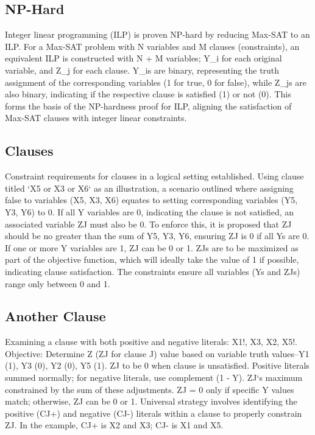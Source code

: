 \subsection*{NP-Hard}
Integer linear programming (ILP) is proven NP-hard by reducing Max-SAT to an ILP\@.
For a Max-SAT problem with N variables and M clauses (constraints), an equivalent ILP is constructed with N + M variables; Y\_i for each original variable, and Z\_j for each clause.
Y\_is are binary, representing the truth assignment of the corresponding variables (1 for true, 0 for false), while Z\_js are also binary, indicating if the respective clause is satisfied (1) or not (0).
This forms the basis of the NP-hardness proof for ILP, aligning the satisfaction of Max-SAT clauses with integer linear constraints.

\subsection*{Clauses}
Constraint requirements for clauses in a logical setting established.
Using clause titled `X5 or X3 or X6` as an illustration, a scenario outlined where assigning false to variables (X5, X3, X6) equates to setting corresponding variables (Y5, Y3, Y6) to 0.
If all Y variables are 0, indicating the clause is not satisfied, an associated variable ZJ must also be 0.
To enforce this, it is proposed that ZJ should be no greater than the sum of Y5, Y3, Y6, ensuring ZJ is 0 if all Ys are 0.
If one or more Y variables are 1, ZJ can be 0 or 1.
ZJs are to be maximized as part of the objective function, which will ideally take the value of 1 if possible, indicating clause satisfaction.
The constraints ensure all variables (Ys and ZJs) range only between 0 and 1.

\subsection*{Another Clause}
Examining a clause with both positive and negative literals: X1!, X3, X2, X5!.
Objective: Determine Z (ZJ for clause J) value based on variable truth values--Y1 (1), Y3 (0), Y2 (0), Y5 (1).
ZJ to be 0 when clause is unsatisfied.
Positive literals summed normally; for negative literals, use complement (1 - Y).
ZJ`s maximum constrained by the sum of these adjustments.
ZJ = 0 only if specific Y values match; otherwise, ZJ can be 0 or 1.
Universal strategy involves identifying the positive (CJ+) and negative (CJ-) literals within a clause to properly constrain ZJ\@.
In the example, CJ+ is X2 and X3; CJ- is X1 and X5.


